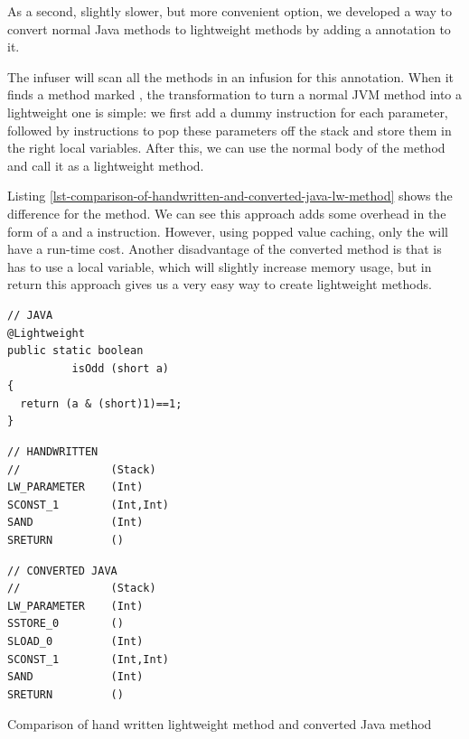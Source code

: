 As a second, slightly slower, but more convenient option, we developed a way to convert normal Java methods to lightweight methods by adding a  annotation to it.

The infuser will scan all the methods in an infusion for this annotation. When it finds a method marked , the transformation to turn a normal JVM method into a lightweight one is simple: we first add a dummy  instruction for each parameter, followed by  instructions to pop these parameters off the stack and store them in the right local variables. After this, we can use the normal body of the method and call it as a lightweight method.

Listing \ref{lst-comparison-of-handwritten-and-converted-java-lw-method} shows the difference for the  method. We can see this approach adds some overhead in the form of a  and a  instruction. However, using popped value caching, only the  will have a run-time cost. Another disadvantage of the converted method is that is has to use a local variable, which will slightly increase memory usage, but in return this approach gives us a very easy way to create lightweight methods.

\begin{listing}
 \centering
 \begin{minipage}[t]{0.32\textwidth}
  \centering
  \begin{verbatim}
// JAVA
@Lightweight
public static boolean
          isOdd (short a)
{
  return (a & (short)1)==1;
}
  \end{verbatim}
 \end{minipage}\hfill
 \begin{minipage}[t]{0.29\textwidth}
  \centering
  \begin{verbatim}
// HANDWRITTEN
//              (Stack)
LW_PARAMETER    (Int)
SCONST_1        (Int,Int)
SAND            (Int)
SRETURN         ()
  \end{verbatim}
 \end{minipage}\hfill
 \begin{minipage}[t]{0.29\textwidth}
  \centering
  \begin{verbatim}
// CONVERTED JAVA
//              (Stack)
LW_PARAMETER    (Int)
SSTORE_0        ()
SLOAD_0         (Int)
SCONST_1        (Int,Int)
SAND            (Int)
SRETURN         ()
  \end{verbatim}
 \end{minipage}
 \vspace{0.5cm}

\caption{Comparison of hand written lightweight method and converted Java method}
\label{lst-comparison-of-handwritten-and-converted-java-lw-method}
\end{listing}


